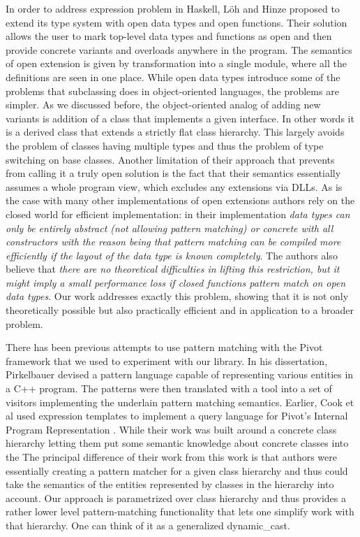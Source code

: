 \documentclass[preprint]{sigplanconf}
\begin{document}
In order to address expression problem in Haskell, L\"{o}h and Hinze proposed to 
extend its type system with open data types and open functions\cite{LohHinze2006}.
Their solution allows the user to mark top-level data types and functions as 
open and then provide concrete variants and overloads anywhere in the program. 
The semantics of open extension is given by transformation into a single module, 
where all the definitions are seen in one place. While open data types introduce 
some of the problems that subclassing does in object-oriented languages, the 
problems are simpler. As we discussed before, the object-oriented analog of 
adding new variants is addition of a class that implements a given interface. In 
other words it is a derived class that extends a strictly flat class hierarchy. 
This largely avoids the problem of classes having multiple types and thus the 
problem of type switching on base classes. Another limitation of their approach 
that prevents from calling it a truly open solution is the fact that their 
semantics essentially assumes a whole program view, which excludes any 
extensions via DLLs. As is the case with many other implementations of open 
extensions authors rely on the closed world for efficient implementation: in 
their implementation \emph{data types can only be entirely abstract (not 
allowing pattern matching) or concrete with all constructors with the reason 
being that pattern matching can be compiled more efficiently if the layout of 
the data type is known completely}. The authors also believe that \emph{there 
are no theoretical difficulties in lifting this restriction, but it might imply 
a small performance loss if closed functions pattern match on open data types}. 
Our work addresses exactly this problem, showing that it is not only 
theoretically possible but also practically efficient and in application to a 
broader problem.





There has been previous attempts to use pattern matching with the Pivot 
framework that we used to experiment with our library. In his dissertation, 
Pirkelbauer devised a pattern language capable of representing various entities 
in a C++ program. The patterns were then translated with a tool into a set of 
visitors implementing the underlain pattern matching 
semantics\cite{PirkelbauerThesis}. Earlier, Cook et al used expression templates 
to implement a query language for Pivot's Internal Program Representation 
\cite{iql04}. While their work was built around a concrete class hierarchy 
letting them put some semantic knowledge about concrete classes into the 
The principal difference of their work from this work is that 
authors were essentially creating a pattern matcher for a given class hierarchy 
and thus could take the semantics of the entities represented by classes in the 
hierarchy into account. Our approach is parametrized over class hierarchy and 
thus provides a rather lower level pattern-matching functionality that lets one 
simplify work with that hierarchy.  One can think of it as a generalized 
dynamic\_cast.
\end{document}
